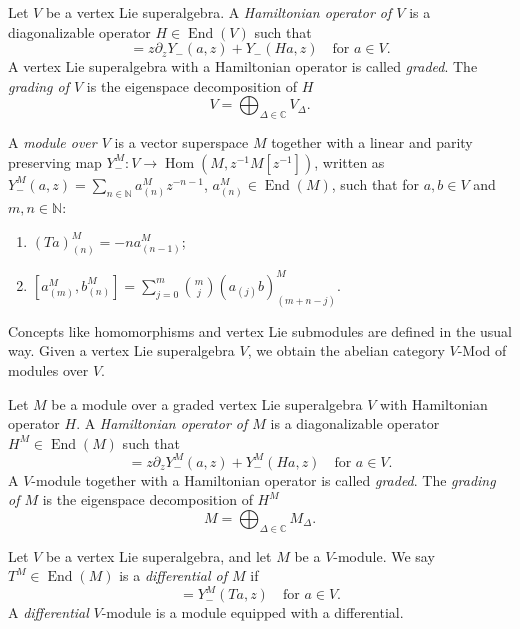\documentclass[a4paper, 12pt, reqno]{amsart}
\theoremstyle{remark}
\DeclareMathOperator{\End}{End}
\DeclareMathOperator{\Hom}{Hom}
\begin{document}
Let $V$ be a vertex Lie superalgebra.
A \emph{Hamiltonian operator of $V$} is a diagonalizable operator $H \in \End(V)$ such that
\begin{equation*}
  [H, Y_-(a, z)] = z\partial_zY_-(a, z) + Y_-(Ha, z) \quad \text{for $a \in V$}.
\end{equation*}
A vertex Lie superalgebra with a Hamiltonian operator is called \emph{graded}.
The \emph{grading of $V$} is the eigenspace decomposition of $H$
\begin{equation*}
  V = \bigoplus_{\Delta \in \mathbb{C}}V_{\Delta}.
\end{equation*}

A \emph{module over $V$} is a vector superspace $M$ together with a linear and parity preserving map $Y^M_-: V \to \Hom(M, z^{-1}M[z^{-1}])$, written as $Y^M_-(a, z) = \sum_{n \in \mathbb{N}}a^M_{(n)}z^{-n - 1}$, $a^M_{(n)} \in \End(M)$, such that for $a, b \in V$ and $m, n \in \mathbb{N}$:
\begin{enumerate}
\item $(Ta)^M_{(n)} = -na^M_{(n - 1)}$;
\item $[a^M_{(m)}, b^M_{(n)}] = \sum_{j = 0}^m\binom{m}{j}(a_{(j)}b)^M_{(m + n - j)}$.
\end{enumerate}
Concepts like homomorphisms and vertex Lie submodules are defined in the usual way.
Given a vertex Lie superalgebra $V$, we obtain the abelian category $V$-Mod of modules over $V$.

Let $M$ be a module over a graded vertex Lie superalgebra $V$ with Hamiltonian operator $H$.
A \emph{Hamiltonian operator of $M$} is a diagonalizable operator $H^M \in \End(M)$ such that
\begin{equation*}
  [H^M, Y^M_-(a, z)] = z\partial_zY^M_-(a, z) + Y^M_-(Ha, z) \quad \text{for $a \in V$}.
\end{equation*}
A $V$-module together with a Hamiltonian operator is called \emph{graded}.
The \emph{grading of $M$} is the eigenspace decomposition of $H^M$
\begin{equation*}
  M = \bigoplus_{\Delta \in \mathbb{C}}M_{\Delta}.
\end{equation*}

Let $V$ be a vertex Lie superalgebra, and let $M$ be a $V$-module.
We say $T^M \in \End(M)$ is a \emph{differential of $M$} if
\begin{equation*}
  [T^M, Y^M_-(a, z)] = Y^M_-(Ta, z) \quad \text{for $a \in V$}.
\end{equation*}
A \emph{differential} $V$-module is a module equipped with a differential.
\end{document}
